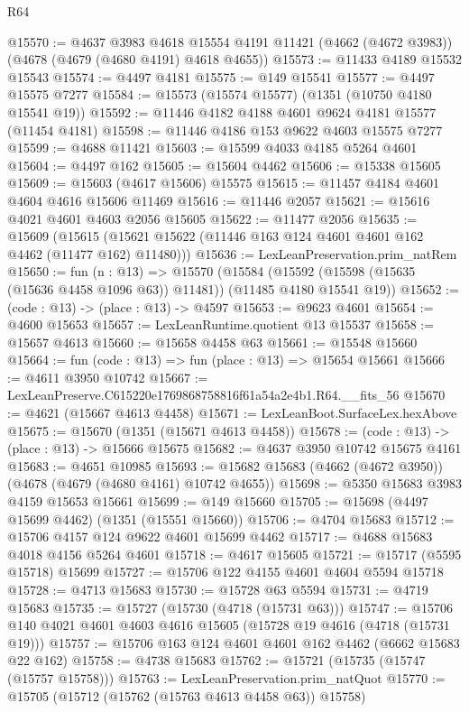 \begin{lexlean}{R64}
\begin{coremodule}
@15570 := @4637
    @3983
    @4618
    @15554
    @4191
    @11421
    (@4662 (@4672 @3983))
    (@4678 (@4679 (@4680 @4191) @4618 @4655))
@15573 := @11433 @4189 @15532 @15543
@15574 := @4497 @4181
@15575 := @149 @15541
@15577 := @4497 @15575 @7277
@15584 := @15573 (@15574 @15577) (@1351 (@10750 @4180 @15541 @19))
@15592 := @11446 @4182 @4188 @4601 @9624 @4181 @15577 (@11454 @4181)
@15598 := @11446 @4186 @153 @9622 @4603 @15575 @7277
@15599 := @4688 @11421
@15603 := @15599 @4033 @4185 @5264 @4601
@15604 := @4497 @162
@15605 := @15604 @4462
@15606 := @15338 @15605
@15609 := @15603 (@4617 @15606) @15575
@15615 := @11457 @4184 @4601 @4604 @4616 @15606 @11469
@15616 := @11446 @2057
@15621 := @15616 @4021 @4601 @4603 @2056 @15605
@15622 := @11477 @2056
@15635 := @15609
    (@15615 (@15621 @15622 (@11446 @163 @124 @4601 @4601 @162 @4462 (@11477 @162) @11480)))
@15636 := LexLeanPreservation.prim_natRem
@15650 := fun (n : @13) =>
  @15570
    (@15584 (@15592 (@15598 (@15635 (@15636 @4458 @1096 @63)) @11481)) (@11485 @4180 @15541 @19))
@15652 := (code : @13) -> (place : @13) -> @4597
@15653 := @9623 @4601
@15654 := @4600 @15653
@15657 := LexLeanRuntime.quotient @13 @15537
@15658 := @15657 @4613
@15660 := @15658 @4458 @63
@15661 := @15548 @15660
@15664 := fun (code : @13) => fun (place : @13) => @15654 @15661
@15666 := @4611 @3950 @10742
@15667 := LexLeanPreserve.C615220e1769868758816f61a54a2e4b1.R64.__fits_56
@15670 := @4621 (@15667 @4613 @4458)
@15671 := LexLeanBoot.SurfaceLex.hexAbove
@15675 := @15670 (@1351 (@15671 @4613 @4458))
@15678 := (code : @13) -> (place : @13) -> @15666 @15675
@15682 := @4637 @3950 @10742 @15675 @4161
@15683 := @4651 @10985
@15693 := @15682 @15683 (@4662 (@4672 @3950)) (@4678 (@4679 (@4680 @4161) @10742 @4655))
@15698 := @5350 @15683 @3983 @4159 @15653 @15661
@15699 := @149 @15660
@15705 := @15698 (@4497 @15699 @4462) (@1351 (@15551 @15660))
@15706 := @4704 @15683
@15712 := @15706 @4157 @124 @9622 @4601 @15699 @4462
@15717 := @4688 @15683 @4018 @4156 @5264 @4601
@15718 := @4617 @15605
@15721 := @15717 (@5595 @15718) @15699
@15727 := @15706 @122 @4155 @4601 @4604 @5594 @15718
@15728 := @4713 @15683
@15730 := @15728 @63 @5594
@15731 := @4719 @15683
@15735 := @15727 (@15730 (@4718 (@15731 @63)))
@15747 := @15706 @140 @4021 @4601 @4603 @4616 @15605 (@15728 @19 @4616 (@4718 (@15731 @19)))
@15757 := @15706 @163 @124 @4601 @4601 @162 @4462 (@6662 @15683 @22 @162)
@15758 := @4738 @15683
@15762 := @15721 (@15735 (@15747 (@15757 @15758)))
@15763 := LexLeanPreservation.prim_natQuot
@15770 := @15705 (@15712 (@15762 (@15763 @4613 @4458 @63)) @15758)

\end{coremodule}
\end{lexlean}
